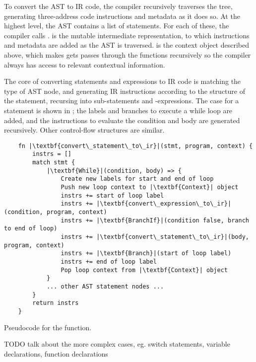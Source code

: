 \documentclass[00-main.tex]{subfiles}
\begin{document}
To convert the AST to IR code, the compiler recursively traverses the tree, generating three-address code instructions and metadata as it does so.
At the highest level, the AST contains a list of statements.
For each of these, the compiler calls .
 is the mutable intermediate representation, to which instructions and metadata are added as the AST is traversed.
 is the context object described above, which makes gets passes through the functions recursively so the compiler always has access to relevant contextual information.

The core of converting statements and expressions to IR code is matching the type of AST node, and generating IR instructions according to the structure of the statement, recursing into sub-statements and -expressions.
The case for a  statement is shown in ; the labels and branches to execute a while loop are added, and the instructions to evaluate the condition and body are generated recursively.
Other control-flow structures are similar.

\begin{listing}[!ht]
  \begin{verbatim}
    fn |\textbf{convert\_statement\_to\_ir}|(stmt, program, context) {
        instrs = []
        match stmt {
            |\textbf{While}|(condition, body) => {
                Create new labels for start and end of loop
                Push new loop context to |\textbf{Context}| object
                instrs += start of loop label
                instrs += |\textbf{convert\_expression\_to\_ir}|(condition, program, context)
                instrs += |\textbf{BranchIf}|(condition false, branch to end of loop)
                instrs += |\textbf{convert\_statement\_to\_ir}|(body, program, context)
                instrs += |\textbf{Branch}|(start of loop label)
                instrs += end of loop label
                Pop loop context from |\textbf{Context}| object
            }
            ... other AST statement nodes ...
        }
        return instrs
    }
  \end{verbatim}
  \caption{Pseudocode for the  function.}
  \label{lst:convert while stmt to IR pseudocode}
\end{listing}

\begin{mrwComment}
TODO talk about the more complex cases, eg. switch statements, variable declarations, function declarations
\end{mrwComment}
\end{document}
